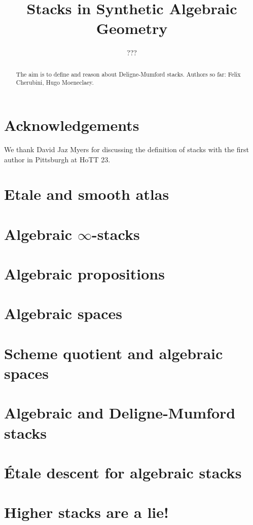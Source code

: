 \documentclass{../util/zariski}
\title{Stacks in Synthetic Algebraic Geometry}
\author{???}
\begin{document}
\maketitle

\begin{abstract}
  The aim is to define and reason about Deligne-Mumford stacks.
  Authors so far: Felix Cherubini, Hugo Moeneclaey.
\end{abstract}

\section*{Acknowledgements}
We thank David Jaz Myers for discussing the definition of stacks with the first author in Pittsburgh at HoTT 23.

\tableofcontents

\section{Etale and smooth atlas}


\section{Algebraic $\infty$-stacks}


\section{Algebraic propositions}


\section{Algebraic spaces}


\section{Scheme quotient and algebraic spaces}


\section{Algebraic and Deligne-Mumford stacks}


\section{Étale descent for algebraic stacks}


\section{Higher stacks are a lie!}



\printindex

\printbibliography
\end{document}
